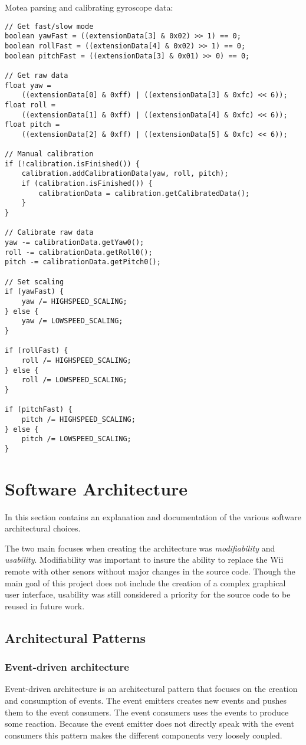 Motea parsing and calibrating gyroscope data:
\begin{lstlisting}
// Get fast/slow mode
boolean yawFast = ((extensionData[3] & 0x02) >> 1) == 0;
boolean rollFast = ((extensionData[4] & 0x02) >> 1) == 0;
boolean pitchFast = ((extensionData[3] & 0x01) >> 0) == 0;

// Get raw data
float yaw = 
	((extensionData[0] & 0xff) | ((extensionData[3] & 0xfc) << 6));
float roll = 
	((extensionData[1] & 0xff) | ((extensionData[4] & 0xfc) << 6));
float pitch = 
	((extensionData[2] & 0xff) | ((extensionData[5] & 0xfc) << 6));

// Manual calibration
if (!calibration.isFinished()) {
	calibration.addCalibrationData(yaw, roll, pitch);
	if (calibration.isFinished()) {
		calibrationData = calibration.getCalibratedData();
	}
}

// Calibrate raw data
yaw -= calibrationData.getYaw0();
roll -= calibrationData.getRoll0();
pitch -= calibrationData.getPitch0();

// Set scaling
if (yawFast) {
	yaw /= HIGHSPEED_SCALING;
} else {
	yaw /= LOWSPEED_SCALING;
}

if (rollFast) {
	roll /= HIGHSPEED_SCALING;
} else {
	roll /= LOWSPEED_SCALING;
}

if (pitchFast) {
	pitch /= HIGHSPEED_SCALING;
} else {
	pitch /= LOWSPEED_SCALING;
}
\end{lstlisting}

\section{Software Architecture}
In this section contains an explanation and documentation of the various software architectural choices.

The two main focuses when creating the architecture was \emph{modifiability} and \emph{usability}. Modifiability was important to insure the ability to replace the Wii remote with other senors without major changes in the source code. Though the main goal of this project does not include the creation of a complex graphical user interface, usability was still considered a priority for the source code to be reused in future work. 

\subsection{Architectural Patterns}
\subsubsection{Event-driven architecture}
Event-driven architecture is an architectural pattern that focuses on the creation and consumption of events. The event emitters creates new events and pushes them to the event consumers. The event consumers uses the events to produce some reaction. Because the event emitter does not directly speak with the event consumers this pattern makes the different components very loosely coupled.


